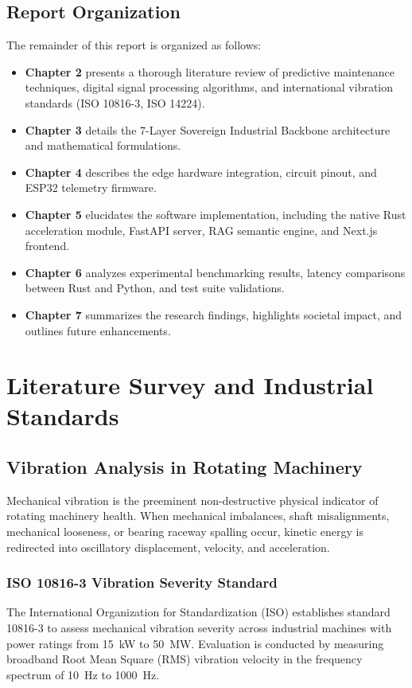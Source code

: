 \documentclass[12pt,a4paper,oneside]{report}
\begin{document}
\section{Report Organization}
The remainder of this report is organized as follows:
\begin{itemize}[leftmargin=*,noitemsep]
    \item \textbf{Chapter 2} presents a thorough literature review of predictive maintenance techniques, digital signal processing algorithms, and international vibration standards (ISO 10816-3, ISO 14224).
    \item \textbf{Chapter 3} details the 7-Layer Sovereign Industrial Backbone architecture and mathematical formulations.
    \item \textbf{Chapter 4} describes the edge hardware integration, circuit pinout, and ESP32 telemetry firmware.
    \item \textbf{Chapter 5} elucidates the software implementation, including the native Rust acceleration module, FastAPI server, RAG semantic engine, and Next.js frontend.
    \item \textbf{Chapter 6} analyzes experimental benchmarking results, latency comparisons between Rust and Python, and test suite validations.
    \item \textbf{Chapter 7} summarizes the research findings, highlights societal impact, and outlines future enhancements.
\end{itemize}

\newpage
\chapter{Literature Survey and Industrial Standards}

\section{Vibration Analysis in Rotating Machinery}
Mechanical vibration is the preeminent non-destructive physical indicator of rotating machinery health. When mechanical imbalances, shaft misalignments, mechanical looseness, or bearing raceway spalling occur, kinetic energy is redirected into oscillatory displacement, velocity, and acceleration.

\subsection{ISO 10816-3 Vibration Severity Standard}
The International Organization for Standardization (ISO) establishes standard 10816-3 to assess mechanical vibration severity across industrial machines with power ratings from 15~kW to 50~MW. Evaluation is conducted by measuring broadband Root Mean Square (RMS) vibration velocity in the frequency spectrum of 10~Hz to 1000~Hz.
\end{document}
